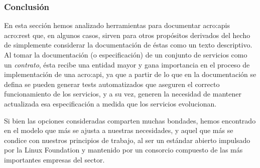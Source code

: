 \subsubsection{Conclusión}

En esta sección hemos analizado herramientas para documentar \glspl{acro:api} \gls{acro:rest} que, en algunos casos, sirven para otros propósitos derivados del hecho de simplemente considerar la documentación de éstas como un texto descriptivo. Al tomar la documentación (o especificación) de un conjunto de servicios como un \textit{contrato}, ésta recibe una entidad mayor y gana importancia en el proceso de implementación de una \gls{acro:api}, ya que a partir de lo que en la documentación se defina se pueden generar tests automatizados que aseguren el correcto funcionamiento de los servicios, y a su vez, generen la necesidad de mantener actualizada esa especificación a medida que los servicios evolucionan.

Si bien las opciones consideradas comparten muchas bondades, hemos encontrado en  el modelo que más se ajusta a nuestras necesidades, y aquel que más se condice con nuestros principios de trabajo, al ser un estándar abierto impulsado por la Linux Foundation y mantenido por un consorcio compuesto de las más importantes empresas del sector.
